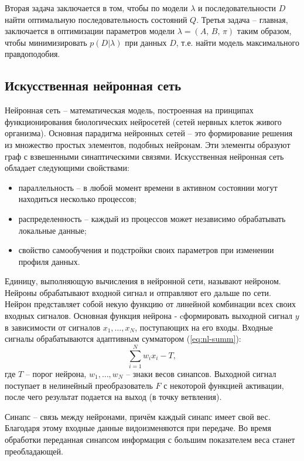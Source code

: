 Вторая задача заключается в том, чтобы по модели $\lambda$ и последовательности $D$ найти оптимальную последовательность состояний $Q$. Третья задача -- главная, заключается в оптимизации параметров модели $\lambda = (A,\,B,\,\pi)$ таким образом, чтобы минимизировать $p(D|\lambda)$ при данных $D$, т.е. найти модель максимального правдоподобия. 

\subsection{Искусственная нейронная сеть}
Нейронная сеть -- математическая модель, построенная на принципах функционирования биологических нейросетей (сетей нервных клеток живого организма). \cite{nl} Основная парадигма нейронных сетей -- это формирование решения из множество простых элементов, подобных нейронам. Эти элементы образуют граф с взвешенными синаптическими связями. Искусственная нейронная сеть обладает следующими свойствами: \cite{dukeNL}
\begin{itemize}
	\item параллельность -- в любой момент времени в активном состоянии могут находиться несколько процессов;
	\item распределенность -- каждый из процессов может независимо обрабатывать локальные данные;
	\item свойство самообучения и подстройки своих параметров при изменении профиля данных.
\end{itemize}

Единицу, выполняющую вычисления в нейронной сети, называют нейроном. Нейроны обрабатывают входной сигнал и отправляют его дальше по сети. Нейрон представляет собой некую функцию от линейной комбинации всех своих входных сигналов. Основная функция нейрона - cформировать выходной сигнал $y$ в зависимости от сигналов $x_1, \dots, x_N$, поступающих на его входы. Входные сигналы обрабатываются адаптивным сумматором (\ref{eq:nl-summ}):
\begin{equation}\label{eq:nl-summ}
	\sum_{i = 1}^{N} w_ix_i - T,
\end{equation}
где $T$ -- порог нейрона, $w_1, \dots, w_N$ -- знаки весов синапсов. Выходной сигнал поступает в нелинейный преобразователь $F$ с некоторой функцией активации, после чего результат подается на выход (в точку ветвления).

Синапс -- связь между нейронами, причём каждый синапс имеет свой вес. Благодаря этому входные данные видоизменяются при передаче. Во время обработки переданная синапсом информация с большим показателем веса станет преобладающей.

